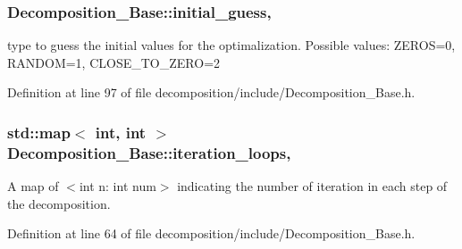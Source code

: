 \subsubsection[{\texorpdfstring{initial\+\_\+guess}{initial_guess}}]{ Decomposition\+\_\+\+Base\+::initial\+\_\+guess\hspace{0.3cm}{\ttfamily [protected]}, {\ttfamily [inherited]}}\hypertarget{class_decomposition___base_ad8df090247ebaea3ebb69e7737b194b9}{}\label{class_decomposition___base_ad8df090247ebaea3ebb69e7737b194b9}


type to guess the initial values for the optimalization. Possible values\+: Z\+E\+R\+OS=0, R\+A\+N\+D\+OM=1, C\+L\+O\+S\+E\+\_\+\+T\+O\+\_\+\+Z\+E\+RO=2 



Definition at line 97 of file decomposition/include/\+Decomposition\+\_\+\+Base.\+h.

\subsubsection[{\texorpdfstring{iteration\+\_\+loops}{iteration_loops}}]{\setlength{\rightskip}{0pt plus 5cm}std\+::map$<$ int, int $>$ Decomposition\+\_\+\+Base\+::iteration\+\_\+loops\hspace{0.3cm}{\ttfamily [protected]}, {\ttfamily [inherited]}}\hypertarget{class_decomposition___base_aa6f08845d47e18b6e6739b46d8fe35eb}{}\label{class_decomposition___base_aa6f08845d47e18b6e6739b46d8fe35eb}


A map of $<$int n\+: int num$>$ indicating the number of iteration in each step of the decomposition. 



Definition at line 64 of file decomposition/include/\+Decomposition\+\_\+\+Base.\+h.

